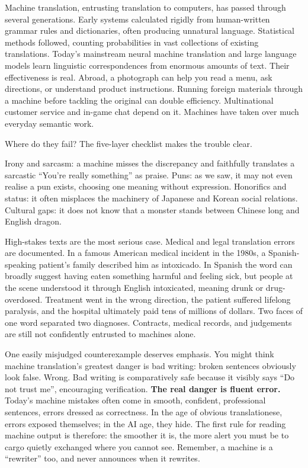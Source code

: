 Machine translation, entrusting translation to computers, has passed through several generations. Early systems calculated rigidly from human-written grammar rules and dictionaries, often producing unnatural language. Statistical methods followed, counting probabilities in vast collections of existing translations. Today's mainstream neural machine translation and large language models learn linguistic correspondences from enormous amounts of text. Their effectiveness is real. Abroad, a photograph can help you read a menu, ask directions, or understand product instructions. Running foreign materials through a machine before tackling the original can double efficiency. Multinational customer service and in-game chat depend on it. Machines have taken over much everyday semantic work.

Where do they fail? The five-layer checklist makes the trouble clear.

Irony and sarcasm: a machine misses the discrepancy and faithfully translates a sarcastic ``You're really something'' as praise. Puns: as we saw, it may not even realise a pun exists, choosing one meaning without expression. Honorifics and status: it often misplaces the machinery of Japanese and Korean social relations. Cultural gaps: it does not know that a monster stands between Chinese long and English dragon.

High-stakes texts are the most serious case. Medical and legal translation errors are documented. In a famous American medical incident in the 1980s, a Spanish-speaking patient's family described him as intoxicado. In Spanish the word can broadly suggest having eaten something harmful and feeling sick, but people at the scene understood it through English intoxicated, meaning drunk or drug-overdosed. Treatment went in the wrong direction, the patient suffered lifelong paralysis, and the hospital ultimately paid tens of millions of dollars. Two faces of one word separated two diagnoses. Contracts, medical records, and judgements are still not confidently entrusted to machines alone.

One easily misjudged counterexample deserves emphasis. You might think machine translation's greatest danger is bad writing: broken sentences obviously look false. Wrong. Bad writing is comparatively safe because it visibly says ``Do not trust me'', encouraging verification. \textbf{The real danger is fluent error.} Today's machine mistakes often come in smooth, confident, professional sentences, errors dressed as correctness. In the age of obvious translationese, errors exposed themselves; in the AI age, they hide. The first rule for reading machine output is therefore: the smoother it is, the more alert you must be to cargo quietly exchanged where you cannot see. Remember, a machine is a ``rewriter'' too, and never announces when it rewrites.

